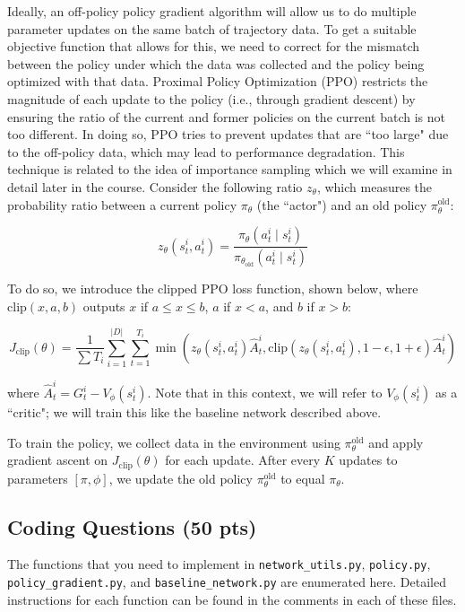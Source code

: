 \documentclass{article}
\begin{document}
Ideally, an off-policy policy gradient algorithm will allow us to do multiple parameter updates on the same batch of trajectory data. To get a suitable objective function that allows for this, we need to correct for the mismatch between the policy under which the data was collected and the policy being optimized with that data. Proximal Policy Optimization (PPO) restricts the magnitude of each update to the policy (i.e., through gradient descent) by ensuring the ratio of the current and former policies on the current batch is not too different. In doing so, PPO tries to prevent updates that are ``too large" due to the off-policy data, which may lead to performance degradation. This technique is related to the idea of importance sampling which we will examine in detail later in the course. Consider the following ratio $z_\theta$, which measures the probability ratio between a current policy $\pi_\theta$ (the ``actor") and an old policy $\pi_\theta^\mathrm{old}$:

$$
z_\theta(s^i_t, a^i_t) = \frac{\pi_\theta(a^i_t \mid s^i_t)}{\pi_{\theta_\mathrm{old}}(a^i_t \mid s^i_t)}
$$

To do so, we introduce the clipped PPO loss function, shown below, where $\mathrm{clip}(x, a, b)$ outputs $x$ if $a \le x \le b$, $a$ if $x < a$, and $b$ if $x > b$:

$$
J_\mathrm{clip}(\theta) = \frac{1}{\sum T_i} \sum_{i=1}^{|D|} \sum_{t=1}^{T_i} \min (z_\theta(s^i_t, a^i_t)  \hat{A}^i_t, \mathrm{clip}(z_\theta(s^i_t, a^i_t)  , 1 - \epsilon, 1 + \epsilon )\hat{A}^i_t)
$$

where $\hat{A}^i_t = G^i_t - V_{\phi}(s^i_t)$. Note that in this context, we will refer to $V_{\phi}(s^i_t)$ as a ``critic"; we will train this like the baseline network described above. 


To train the policy, we collect data in the environment using $\pi_\theta^\mathrm{old}$ and apply gradient ascent on $J_\mathrm{clip}(\theta)$ for each update. After every $K$ updates to parameters $[\pi, \phi]$, we update the old policy $\pi_\theta^\mathrm{old}$ to equal $\pi_\theta$. 

\subsection{Coding Questions (50 pts)}
The functions that you need to implement in \texttt{network\_utils.py}, \texttt{policy.py}, \texttt{policy\_gradient.py}, and \texttt{baseline\_network.py} are enumerated here. Detailed instructions for each function can be found in the comments in each of these files.
\end{document}
